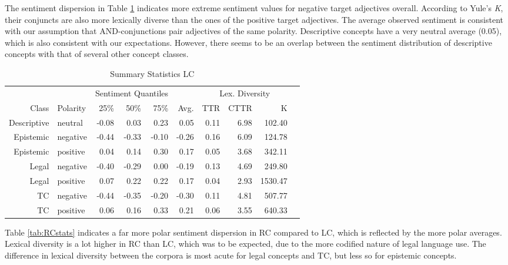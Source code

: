 \documentclass{article}
\begin{document}
The sentiment dispersion in Table \ref{tab:LCstats} indicates more extreme sentiment values for negative target adjectives overall. According to Yule's \textit{K}, their conjuncts are also more lexically diverse than the ones of the positive target adjectives. The average observed sentiment is consistent with our assumption that AND-conjunctions pair adjectives of the same polarity. Descriptive concepts have a very neutral average (0.05), which is also consistent with our expectations. However, there seems to be an overlap between the sentiment distribution of descriptive concepts with that of several other concept classes.

\begin{table}[!h]
\centering
{}
\begin{tabular}{rlrrrrrrrr}
  & & \multicolumn{3}{c}{Sentiment Quantiles} & & \multicolumn{3}{c}{Lex. Diversity}\\
   \cmidrule{3-5} \cmidrule{7-9}
  Class & Polarity & 25\% & 50\% & 75\% & Avg. &  TTR & CTTR & K\\
  \bottomrule
Descriptive & neutral & -0.08 & 0.03 & 0.23 & 0.05 & 0.11 & 6.98 & 102.40 \\ 
  Epistemic & negative & -0.44 & -0.33 & -0.10 & -0.26 & 0.16 & 6.09 & 124.78 \\ 
  Epistemic & positive & 0.04 & 0.14 & 0.30 & 0.17 & 0.05 & 3.68 & 342.11 \\ 
  Legal & negative & -0.40 & -0.29 & 0.00 & -0.19 & 0.13 & 4.69 & 249.80 \\ 
  Legal & positive & 0.07 & 0.22 & 0.22 & 0.17 & 0.04 & 2.93 & 1530.47 \\ 
  TC & negative & -0.44 & -0.35 & -0.20 & -0.30 & 0.11 & 4.81 & 507.77 \\ 
  TC & positive & 0.06 & 0.16 & 0.33 & 0.21 & 0.06 & 3.55 & 640.33 \\ 
   \hline
\end{tabular}
\caption{Summary Statistics LC}
\label{tab:LCstats}
\end{table}

Table \ref{tab:RCstats} indicates a far more polar sentiment dispersion in RC compared to LC, which is reflected by the more polar averages. Lexical diversity is a lot higher in RC than LC, which was to be expected, due to the more codified nature of legal language use. The difference in lexical diversity between the corpora is most acute for legal concepts and TC, but less so for epistemic concepts.
\end{document}
